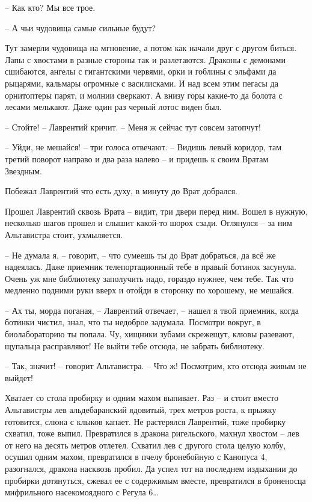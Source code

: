 \documentclass[ebook,oneside,final,openright]{memoir}
\begin{document}
– Как кто? Мы все трое.\par
– А чьи чудовища самые сильные будут?\par
Тут замерли чудовища на мгновение, а потом как начали друг с другом биться. Лапы с хвостами в разные стороны так и разлетаются. Драконы с демонами сшибаются, ангелы с гигантскими червями, орки и гоблины с эльфами да рыцарями, кальмары огромные с василисками. И над всем этим пегасы да орнитоптеры парят, и молнии сверкают. А внизу горы какие-то да болота с лесами мелькают. Даже один раз черный лотос виден был. \par
– Стойте! – Лаврентий кричит. – Меня ж сейчас тут совсем затопчут!\par
– Уйди, не мешайся! – три голоса отвечают. – Видишь левый коридор, там третий поворот направо и два раза налево – и придешь к своим Вратам Звездным.\par
\par
Побежал Лаврентий что есть духу, в минуту до Врат добрался.\par
\par
Прошел Лаврентий сквозь Врата – видит, три двери перед ним. Вошел в нужную, несколько шагов прошел и слышит какой-то шорох сзади. Оглянулся – за ним Альтавистра стоит, ухмыляется. \par
\par
– Не думала я, – говорит, – что сумеешь ты до Врат добраться, да всё же надеялась. Даже приемник телепортационный тебе в правый ботинок засунула. Очень уж мне библиотеку заполучить надо, гораздо нужнее, чем тебе. Так что медленно подними руки вверх и отойди в сторонку по хорошему, не мешайся.\par
– Ах ты, морда поганая, – Лаврентий отвечает, – нашел я твой приемник, когда ботинки чистил, знал, что ты недоброе задумала. Посмотри вокруг, в биолабораторию ты попала. Чу, хищники зубами скрежещут, клювы разевают, щупальца расправляют! Не выйти тебе отсюда, не забрать библиотеку.\par
– Так, значит! – говорит Альтавистра. – Что ж! Посмотрим, кто отсюда живым не выйдет!\par
\par
Хватает со стола пробирку и одним махом выпивает. Раз – и стоит вместо Альтавистры лев альдебаранский ядовитый, трех метров роста, к прыжку готовится, слюна с клыков капает. Не растерялся Лаврентий, тоже пробирку схватил, тоже выпил. Превратился в дракона ригельского, махнул хвостом – лев от него на десять метров отлетел. Схватил лев с другого стола целую колбу, осушил одним махом, превратился в пчелу бронебойную с Канопуса 4, разогнался, дракона насквозь пробил. Да успел тот на последнем издыхании до пробирки дотянуться, сжевал ее с содержимым вместе, превратился в броненосца мифрильного насекомоядного с Регула 6…\par
\end{document}
